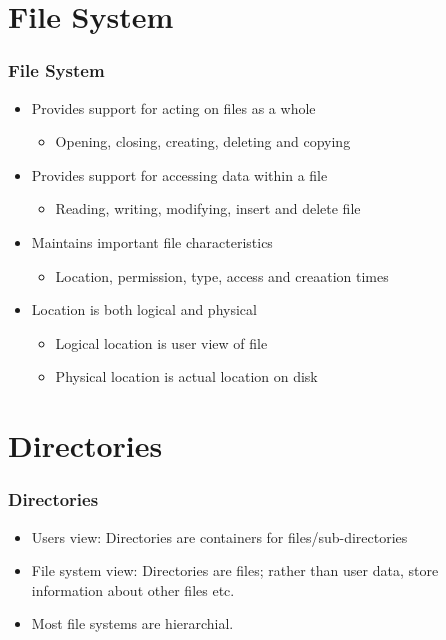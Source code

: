 \documentclass{beamer}
\begin{document}
\section{File System}
\begin{frame}
\frametitle{File System}
\begin{itemize}
\item Provides support for acting on files as a whole
\begin{itemize}
\item Opening, closing, creating, deleting and copying
\end{itemize}
\item Provides support for accessing data within a file
\begin{itemize}
\item Reading, writing, modifying, insert and delete file
\end{itemize}
\item Maintains important file characteristics
\begin{itemize}
\item Location, permission, type, access and creaation times 
\end{itemize}
\item Location is both logical and physical
\begin{itemize}
\item Logical location is user view of file
\item Physical location is actual location on disk
\end{itemize}
\end{itemize}
\end{frame}
\section{Directories}
\begin{frame}
\frametitle{Directories}
\begin{itemize}
\item Users view: Directories are containers for files/sub-directories
\item File system view: Directories are files; rather than user data, store information about other files etc.
\item Most file systems are hierarchial.
\end{itemize}
\end{frame}
\end{document}
